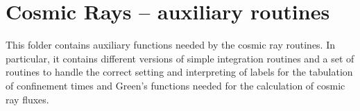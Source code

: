\section{Cosmic Rays -- auxiliary routines}

This folder contains auxiliary functions needed by the cosmic ray routines. In particular,
it contains different versions of simple integration routines and a set of routines
to handle the correct setting and interpreting of labels for the tabulation of confinement times
and Green's functions needed for the calculation of cosmic ray fluxes.
